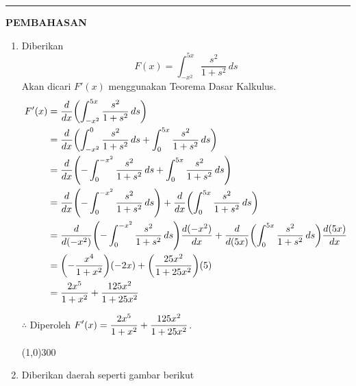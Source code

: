 \vspace{0.2cm}
\hrule height 1pt
\vspace{0.5cm}
\begin{center}
    \textbf{\large{PEMBAHASAN}}
\end{center}
\begin{enumerate}[leftmargin=*, label={\arabic*}.]
\item Diberikan
\[
F(x) = \int_{-x^{2}}^{5x}\frac{s^{2}}{1+s^{2}}\,ds
\]
Akan dicari $F'(x)$ menggunakan Teorema Dasar Kalkulus.
\begin{align*}
    F'(x) &= \drv{x}{\int_{-x^{2}}^{5x}\frac{s^{2}}{1+s^{2}}\,ds}\\
    &= \drv{x}{\int_{-x^{2}}^{0}\frac{s^{2}}{1+s^{2}}\,ds
    +\int_{0}^{5x}\frac{s^{2}}{1+s^{2}}\,ds}\\
    &= \drv{x}{-\int_{0}^{-x^{2}}\frac{s^{2}}{1+s^{2}}\,ds
    +\int_{0}^{5x}\frac{s^{2}}{1+s^{2}}\,ds}\\
    &= \drv{x}{-\int_{0}^{-x^{2}}\frac{s^{2}}{1+s^{2}}\,ds}+
    \drv{x}{\int_{0}^{5x}\frac{s^{2}}{1+s^{2}}\,ds}\\
    &= \drv{(-x^{2})}{-\int_{0}^{-x^{2}}\frac{s^{2}}{1+s^{2}}\,ds}\frac{d(-x^{2})}{dx}+
    \drv{(5x)}{\int_{0}^{5x}\frac{s^{2}}{1+s^{2}}\,ds}\frac{d(5x)}{dx}\\
    &= \brk*{-\frac{x^{4}}{1+x^{2}}}(-2x)+\brk*{\frac{25x^{2}}{1+25x^{2}}}(5)\\
    &= \frac{2x^{5}}{1+x^{2}}+\frac{125x^{2}}{1+25x^{2}}\\
\end{align*}

$\therefore$ Diperoleh $\displaystyle F'(x) =\frac{2x^{5}}{1+x^{2}}+\frac{125x^{2}}{1+25x^{2}}$.
\begin{center}
    \line(1,0){300}
\end{center}
\item Diberikan daerah seperti gambar berikut
\begin{center}
\end{center}
    

\end{enumerate}
